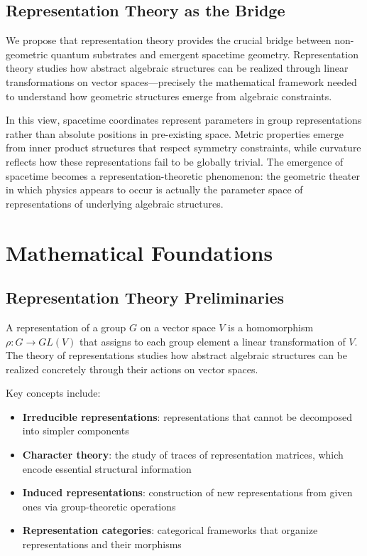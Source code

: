 \documentclass[12pt]{article}
\begin{document}
\subsection{Representation Theory as the Bridge}

We propose that representation theory provides the crucial bridge between non-geometric quantum substrates and emergent spacetime geometry. Representation theory studies how abstract algebraic structures can be realized through linear transformations on vector spaces—precisely the mathematical framework needed to understand how geometric structures emerge from algebraic constraints.

In this view, spacetime coordinates represent parameters in group representations rather than absolute positions in pre-existing space. Metric properties emerge from inner product structures that respect symmetry constraints, while curvature reflects how these representations fail to be globally trivial. The emergence of spacetime becomes a representation-theoretic phenomenon: the geometric theater in which physics appears to occur is actually the parameter space of representations of underlying algebraic structures.

\section{Mathematical Foundations}

\subsection{Representation Theory Preliminaries}

A representation of a group $G$ on a vector space $V$ is a homomorphism $\rho: G \to GL(V)$ that assigns to each group element a linear transformation of $V$. The theory of representations studies how abstract algebraic structures can be realized concretely through their actions on vector spaces.

Key concepts include:
\begin{itemize}
\item \textbf{Irreducible representations}: representations that cannot be decomposed into simpler components
\item \textbf{Character theory}: the study of traces of representation matrices, which encode essential structural information
\item \textbf{Induced representations}: construction of new representations from given ones via group-theoretic operations
\item \textbf{Representation categories}: categorical frameworks that organize representations and their morphisms
\end{itemize}
\end{document}
